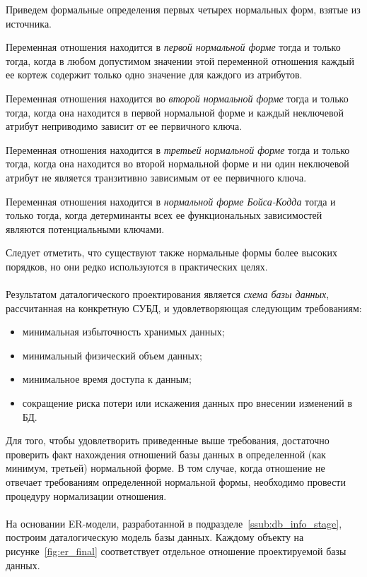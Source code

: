 Приведем формальные определения первых четырех нормальных форм, взятые из источника.

Переменная отношения находится в \textit{первой нормальной форме} тогда
и только тогда, когда в любом допустимом значении этой переменной отношения каждый
ее кортеж содержит только одно значение для каждого из атрибутов.

Переменная отношения находится во \textit{второй нормальной форме} тогда и только тогда,
когда она находится в первой нормальной форме и каждый неключевой атрибут
неприводимо зависит от ее первичного ключа.

Переменная отношения находится в \textit{третьей нормальной форме} тогда и только тогда,
когда она находится во второй нормальной форме и ни один неключевой атрибут не является
транзитивно зависимым от ее первичного ключа.

Переменная отношения находится в \textit{нормальной форме Бойса-Кодда} тогда и только тогда,
когда детерминанты всех ее функциональных зависимостей являются потенциальными ключами.

Следует отметить, что существуют также нормальные формы более высоких порядков,
но они редко используются в практических целях.  

\paragraph{}
Результатом даталогического проектирования является \textit{схема базы данных},
рассчитанная на конкретную СУБД, и удовлетворяющая следующим требованиям:
\begin{itemize}
  \item минимальная избыточность хранимых данных;
  \item минимальный физический объем данных;
  \item минимальное время доступа к данным;
  \item сокращение риска потери или искажения данных про внесении изменений в БД.
\end{itemize}

Для того, чтобы удовлетворить приведенные выше требования, достаточно проверить факт
нахождения отношений базы данных в определенной (как минимум, третьей) нормальной форме.
В том случае, когда отношение не отвечает требованиям определенной нормальной формы,
необходимо провести процедуру нормализации отношения.

\paragraph{}
На основании ER-модели, разработанной в подразделе~\ref{ssub:db_info_stage}, 
построим даталогическую модель базы данных.
Каждому объекту на рисунке~\ref{fig:er_final} соответствует отдельное отношение
проектируемой базы данных. 


